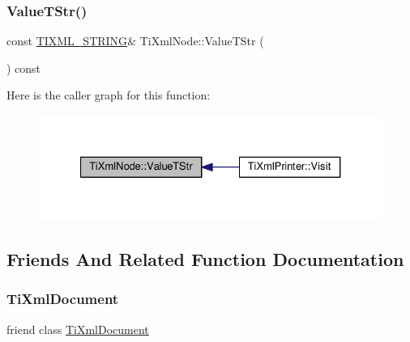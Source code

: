 \subsubsection{\texorpdfstring{Value\+T\+Str()}{ValueTStr()}}
{\footnotesize\ttfamily const \hyperlink{tinyxml_8h_a92bada05fd84d9a0c9a5bbe53de26887}{T\+I\+X\+M\+L\+\_\+\+S\+T\+R\+I\+NG}\& Ti\+Xml\+Node\+::\+Value\+T\+Str (\begin{DoxyParamCaption}{ }\end{DoxyParamCaption}) const\hspace{0.3cm}{\ttfamily [inline]}}

Here is the caller graph for this function\+:
\nopagebreak
\begin{figure}[H]
\begin{center}
\leavevmode
\includegraphics[width=327pt]{class_ti_xml_node_a74c4ea4a91c0a91900c919f69f657d6a_icgraph}
\end{center}
\end{figure}


\subsection{Friends And Related Function Documentation}
\mbox{\label{class_ti_xml_node_a173617f6dfe902cf484ce5552b950475}} 
\subsubsection{\texorpdfstring{Ti\+Xml\+Document}{TiXmlDocument}}
{\footnotesize\ttfamily friend class \hyperlink{class_ti_xml_document}{Ti\+Xml\+Document}\hspace{0.3cm}{\ttfamily [friend]}}

\mbox{\label{class_ti_xml_node_ab6592e32cb9132be517cc12a70564c4b}} 
